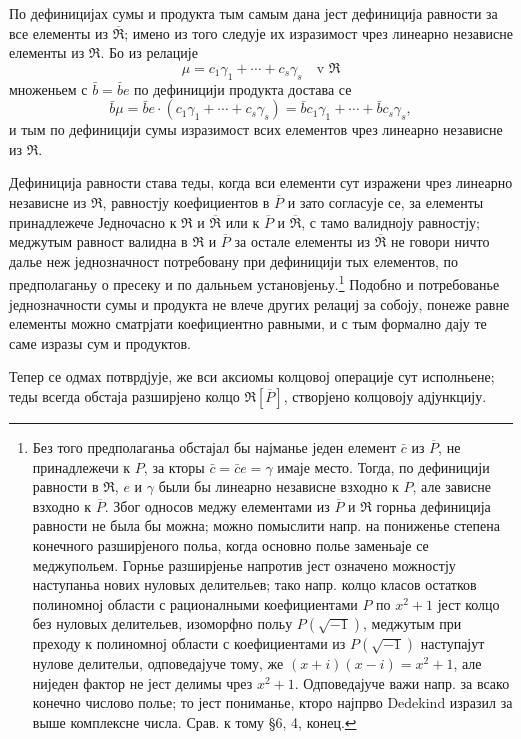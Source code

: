 \documentclass[11pt]{article}
\begin{document}
По дефиницијах сумы и продукта тым самым дана јест дефиниција равности за все елементы из $\overline{\mathfrak R}$; имено из того следује их изразимост чрез линеарно независне елементы из $\mathfrak R$. Бо из релације
\[
   \mu=c_1\gamma_1+\cdots+c_s\gamma_s\quad\text{v }\mathfrak R
\]
множеньем с $\bar b=\bar b e$ по дефиницији продукта достава се
\[
   \bar b\mu=\bar b e\cdot(c_1\gamma_1+\cdots+c_s\gamma_s)
      =\bar b c_1\gamma_1+\cdots+\bar b c_s\gamma_s,
\]
и тым по дефиницији сумы изразимост всих елементов чрез линеарно независне из $\mathfrak R$.

Дефиниција равности става теды, когда вси елементи сут изражени чрез линеарно независне из $\mathfrak R$, равностју коефициентов в $\overline P$ и зато согласује се, за елементы принадлежече Једночасно к $\mathfrak R$ и $\overline{\mathfrak R}$ или к $\overline P$ и $\overline{\mathfrak R}$, с тамо валидноју равностју; меджутым равност валидна в $\mathfrak R$ и $\overline P$ за остале елементы из $\overline{\mathfrak R}$ не говори ничто далье неж једнозначност потребовану при дефиницији тых елементов, по предполаганьу о пресеку и по дальньем установјеньу.\footnote{Без того предполаганьа обстајал бы најманье једен елемент $\bar c$ из $\overline P$, не принадлежечи к $P$, за кторы $\bar c=\bar c e=\gamma$ имаје место. Тогда, по дефиницији равности в $\mathfrak R$, $e$ и $\gamma$ были бы линеарно независне взходно к $P$, але зависне взходно к $\overline P$. Због односов меджу елементами из $\overline P$ и $\mathfrak R$ горньа дефиниција равности не была бы можна; можно помыслити напр. на пониженье степена конечного разширјеного польа, когда основно полье заменьаје се меджупольем. Горнье разширјенье напротив јест означено можностју наступаньа нових нуловых делительев; тако напр. колцо класов остатков полиномној области с рационалными коефициентами $P$ по $x^2+1$ јест колцо без нуловых делительев, изоморфно польу $P(\sqrt{-1})$, меджутым при преходу к полиномној области с коефициентами из $P(\sqrt{-1})$ наступајут нулове делительи, одповедајуче тому, же $(x+i)(x-i)=x^2+1$, але ниједен фактор не јест делимы чрез $x^2+1$. Одповедајуче важи напр. за всако конечно числово полье; то јест пониманье, кторо најпрво Dedekind изразил за выше комплексне числа. Срав. к тому \S 6, 4, конец.} Подобно и потребованье једнозначности сумы и продукта не влече других релациј за собоју, понеже равне елементы можно сматрјати коефициентно равными, и с тым формално дају те саме изразы сум и продуктов.

Тепер се одмах потврдјује, же вси аксиомы колцовој операције сут исполньене; теды всегда обстаја разширјено колцо $\mathfrak R[\overline P]$, створјено колцовоју адјункцију.
\end{document}
